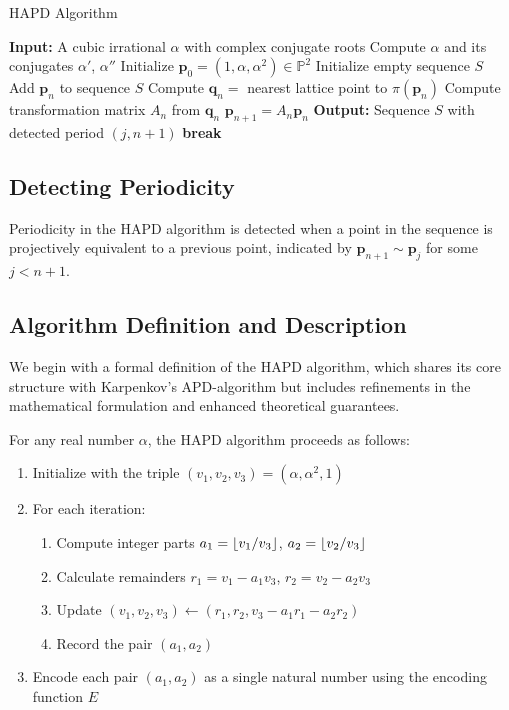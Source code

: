 \begin{algorithm}
\caption{HAPD Algorithm}
\begin{algorithmic}[1]
\State \textbf{Input:} A cubic irrational $\alpha$ with complex conjugate roots
\State Compute $\alpha$ and its conjugates $\alpha'$, $\alpha''$
\State Initialize $\mathbf{p}_0 = (1, \alpha, \alpha^2) \in \mathbb{P}^2$
\State Initialize empty sequence $S$
    \State Add $\mathbf{p}_n$ to sequence $S$
    \State Compute $\mathbf{q}_n = $ nearest lattice point to $\pi(\mathbf{p}_n)$
    \State Compute transformation matrix $A_n$ from $\mathbf{q}_n$
    \State $\mathbf{p}_{n+1} = A_n \mathbf{p}_n$
        \State \textbf{Output:} Sequence $S$ with detected period $(j, n+1)$
        \State \textbf{break}
    \EndIf
\EndFor
\end{algorithmic}
\end{algorithm}

\subsection{Detecting Periodicity}

Periodicity in the HAPD algorithm is detected when a point in the sequence is projectively equivalent to a previous point, indicated by $\mathbf{p}_{n+1} \sim \mathbf{p}_j$ for some $j < n+1$.

\subsection{Algorithm Definition and Description}

We begin with a formal definition of the HAPD algorithm, which shares its core structure with Karpenkov's APD-algorithm but includes refinements in the mathematical formulation and enhanced theoretical guarantees.

\begin{algorithm_def}\label{alg:hapd}
For any real number $\alpha$, the HAPD algorithm proceeds as follows:
\begin{enumerate}
    \item Initialize with the triple $(v_1, v_2, v_3) = (\alpha, \alpha^2, 1)$
    \item For each iteration:
    \begin{enumerate}
        \item Compute integer parts $a_1 = \lfloor v_1/v_3 \rfloor$, $a_2 = \lfloor v_2/v_3 \rfloor$
        \item Calculate remainders $r_1 = v_1 - a_1v_3$, $r_2 = v_2 - a_2v_3$
        \item Update $(v_1, v_2, v_3) \leftarrow (r_1, r_2, v_3 - a_1r_1 - a_2r_2)$
        \item Record the pair $(a_1, a_2)$
    \end{enumerate}
    \item Encode each pair $(a_1, a_2)$ as a single natural number using the encoding function $E$
\end{enumerate}
\end{algorithm_def}

